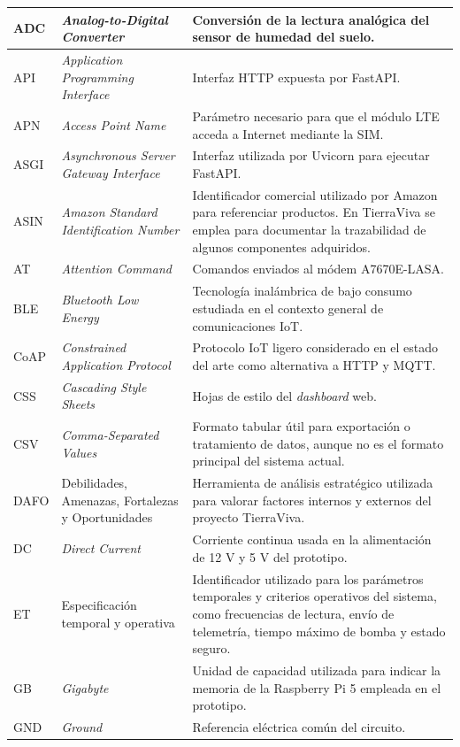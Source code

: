 \begin{longtable}{|p{}|p{}|p{}|}
ADC & \textit{Analog-to-Digital Converter} & Conversión de la lectura analógica del sensor de humedad del suelo. \\
\hline
API & \textit{Application Programming Interface} & Interfaz HTTP expuesta por FastAPI. \\
\hline
APN & \textit{Access Point Name} & Parámetro necesario para que el módulo LTE acceda a Internet mediante la SIM. \\
\hline
ASGI & \textit{Asynchronous Server Gateway Interface} & Interfaz utilizada por Uvicorn para ejecutar FastAPI. \\
\hline
ASIN & \textit{Amazon Standard Identification Number} & Identificador comercial utilizado por Amazon para referenciar productos. En TierraViva se emplea para documentar la trazabilidad de algunos componentes adquiridos. \\
\hline
AT & \textit{Attention Command} & Comandos enviados al módem A7670E-LASA. \\
\hline
BLE & \textit{Bluetooth Low Energy} & Tecnología inalámbrica de bajo consumo estudiada en el contexto general de comunicaciones IoT. \\
\hline
CoAP & \textit{Constrained Application Protocol} & Protocolo IoT ligero considerado en el estado del arte como alternativa a HTTP y MQTT. \\
\hline
CSS & \textit{Cascading Style Sheets} & Hojas de estilo del \textit{dashboard} web. \\
\hline
CSV & \textit{Comma-Separated Values} & Formato tabular útil para exportación o tratamiento de datos, aunque no es el formato principal del sistema actual. \\
\hline
DAFO & Debilidades, Amenazas, Fortalezas y Oportunidades & Herramienta de análisis estratégico utilizada para valorar factores internos y externos del proyecto TierraViva. \\
\hline
DC & \textit{Direct Current} & Corriente continua usada en la alimentación de 12 V y 5 V del prototipo. \\
\hline
ET & Especificación temporal y operativa & Identificador utilizado para los parámetros temporales y criterios operativos del sistema, como frecuencias de lectura, envío de telemetría, tiempo máximo de bomba y estado seguro. \\
\hline
GB & \textit{Gigabyte} & Unidad de capacidad utilizada para indicar la memoria de la Raspberry Pi 5 empleada en el prototipo. \\
\hline
GND & \textit{Ground} & Referencia eléctrica común del circuito. \\

\end{longtable}
